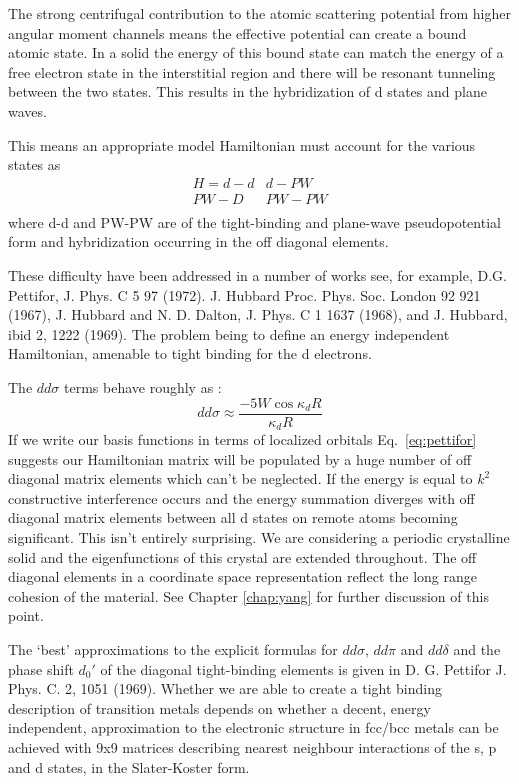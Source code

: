 The strong centrifugal contribution to the
atomic scattering potential from higher angular moment channels means the effective potential
can create a bound atomic state. In a solid the energy of this bound state can match the 
energy of a free electron state in the interstitial region and there will
be resonant tunneling between the two states. This results in the hybridization of d states
and plane waves. 

This means an appropriate model Hamiltonian must account for the various states as
%
\begin{eqnarray}
\label{eq:d-hamiltonian}
H = d-d  & d-PW \\
    PW-D & PW-PW \\
\end{eqnarray}
%
where d-d and PW-PW are of the tight-binding and plane-wave 
pseudopotential form and hybridization occurring in the 
off diagonal elements. 

These difficulty have been addressed in a number of works 
see, for example, D.G. Pettifor, J. Phys. C 5 97 (1972).
J. Hubbard Proc. Phys. Soc. London 92 921 (1967),
J. Hubbard and N. D. Dalton, J. Phys. C 1 1637 (1968),
and J. Hubbard, ibid 2, 1222 (1969). The problem being to define an
energy independent Hamiltonian, amenable to tight binding for the d electrons.

The $dd\sigma$ terms behave roughly as \cite{pettifor71}:
%
\begin{equation}
\label{eq:pettifor}
dd\sigma \approx \frac{-5W\cos\kappa_{d}R}{\kappa_{d}R}
\end{equation}
%
If we write our basis functions in terms of localized orbitals
Eq.~\ref{eq:pettifor} suggests our Hamiltonian matrix will be 
populated by a huge number of off diagonal matrix elements which can't be neglected. If 
the energy is equal to $k^{2}$ constructive interference occurs and the energy summation
diverges with off diagonal matrix elements between all d states on remote atoms becoming
significant. This isn't entirely surprising. We are considering a periodic crystalline solid
and the eigenfunctions of this crystal are extended throughout. The off diagonal elements
in a coordinate space representation reflect the long range cohesion of the material. See
Chapter \ref{chap:yang} for further discussion of this point.

The `best' approximations to the explicit formulas for $dd\sigma$, $dd\pi$ and $dd\delta$ and the phase
shift $d_{0}'$ of the diagonal tight-binding elements is given in D. G. Pettifor J. Phys. C. 2, 1051 (1969).
Whether we are able to create a tight binding description of transition metals
depends on whether a decent, energy independent, approximation to the electronic structure in fcc/bcc metals
can be achieved with 9x9 matrices describing nearest neighbour interactions of the s, p and d states,
in the Slater-Koster form.\cite{salter54}

